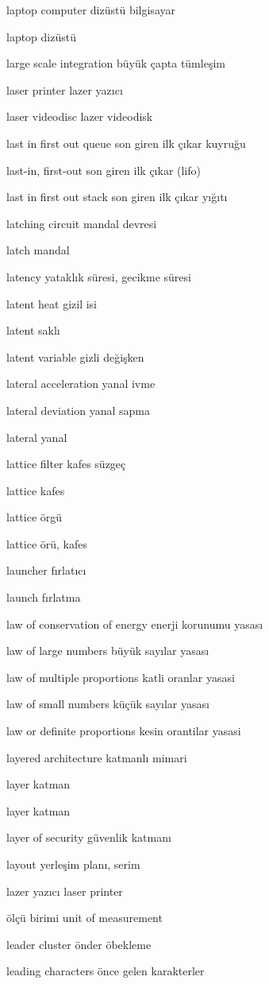 \documentclass[12pt,fleqn]{article}\usepackage{../../common}
\begin{document}
laptop computer dizüstü bilgisayar

laptop dizüstü

large scale integration büyük çapta tümleşim

laser printer lazer yazıcı

laser videodisc lazer videodisk

last in first out queue son giren ilk çıkar kuyruğu

last-in, first-out son giren ilk çıkar (lifo)

last in first out stack son giren ilk çıkar yığıtı

latching circuit mandal devresi

latch mandal

latency yataklık süresi, gecikme süresi

latent heat gizil isi

latent saklı

latent variable gizli değişken

lateral acceleration yanal ivme

lateral deviation yanal sapma

lateral yanal

lattice filter kafes süzgeç

lattice kafes

lattice örgü

lattice örü, kafes

launcher fırlatıcı

launch fırlatma

law of conservation of energy enerji korunumu yasası

law of large numbers büyük sayılar yasası

law of multiple proportions katli oranlar yasasi

law of small numbers küçük sayılar yasası

law or definite proportions kesin orantilar yasasi

layered architecture katmanlı mimari

layer katman

layer katman

layer of security güvenlik katmanı

layout yerleşim planı, serim

lazer yazıcı laser printer

ölçü birimi unit of measurement

leader cluster önder öbekleme

leading characters önce gelen karakterler
\end{document}
